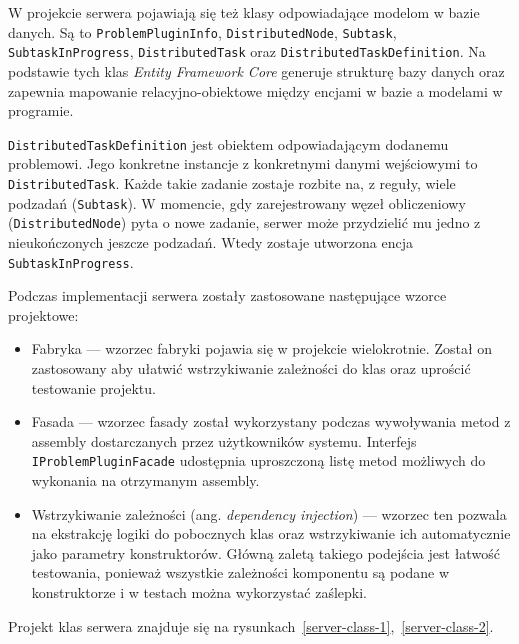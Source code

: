 \documentclass[a4paper,11pt,twoside]{report}
\theoremstyle{definition}
\begin{document}
W projekcie serwera pojawiają się też klasy odpowiadające modelom w bazie danych.
Są to \texttt{ProblemPluginInfo}, \texttt{DistributedNode}, \texttt{Subtask}, \texttt{SubtaskInProgress}, \texttt{DistributedTask} oraz \texttt{DistributedTaskDefinition}.
Na podstawie tych klas \textit{Entity Framework Core} generuje strukturę bazy danych oraz zapewnia mapowanie relacyjno-obiektowe między encjami w bazie a modelami w programie.

\texttt{DistributedTaskDefinition} jest obiektem odpowiadającym dodanemu problemowi.
Jego konkretne instancje z konkretnymi danymi wejściowymi to \texttt{DistributedTask}.
Każde takie zadanie zostaje rozbite na, z reguły, wiele podzadań (\texttt{Subtask}).
W momencie, gdy zarejestrowany węzeł obliczeniowy (\texttt{DistributedNode}) pyta o nowe zadanie, serwer może przydzielić mu jedno z nieukończonych jeszcze podzadań.
Wtedy zostaje utworzona encja \texttt{SubtaskInProgress}.


Podczas implementacji serwera zostały zastosowane następujące wzorce projektowe:
\begin{itemize}
    \item Fabryka --- wzorzec fabryki pojawia się w projekcie wielokrotnie. Został on zastosowany aby ułatwić wstrzykiwanie zależności do klas oraz uprościć testowanie projektu.
    \item Fasada --- wzorzec fasady został wykorzystany podczas wywoływania metod z assembly dostarczanych przez użytkowników systemu. Interfejs \texttt{IProblemPluginFacade} udostępnia  uproszczoną listę metod możliwych do wykonania na otrzymanym assembly.
    \item Wstrzykiwanie zależności (ang. \textit{dependency injection}) --- wzorzec ten pozwala na ekstrakcję logiki do pobocznych klas oraz wstrzykiwanie ich automatycznie jako parametry konstruktorów. Główną zaletą takiego podejścia jest łatwość testowania, ponieważ wszystkie zależności komponentu są podane w konstruktorze i w testach można wykorzystać zaślepki.
\end{itemize}

Projekt klas serwera znajduje się na rysunkach~\ref{server-class-1},~\ref{server-class-2}.
\end{document}
